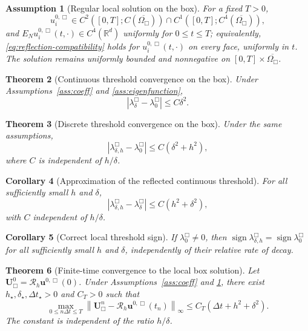 \documentclass[11pt]{article}
\newtheorem{theorem}{Theorem}[section]
\newtheorem{corollary}[theorem]{Corollary}
\newtheorem{assumption}[theorem]{Assumption}
\theoremstyle{definition}
\newcommand{\R}{\mathbb{R}}
\newcommand{\cR}{\mathcal{R}}
\newcommand{\norm}[1]{\left\lVert #1\right\rVert}
\newcommand{\U}{\bm U}
\newcommand{\uvec}{\bm u}
\begin{document}
\begin{assumption}[Regular local solution on the box]
\label{ass:solution-reg}
For a fixed $T>0$,
\[
 u_i^{0,\Box}
 \in C^2([0,T];C(\overline{\Omega_{\Box}}))
 \cap C^1([0,T];C^4(\overline{\Omega_{\Box}})),
\]
and $E_Nu_i^{0,\Box}(t,\cdot)\in C^4(\R^d)$ uniformly for $0\le t\le T$; equivalently, \eqref{eq:reflection-compatibility} holds for $u_i^{0,\Box}(t,\cdot)$ on every face, uniformly in $t$.  The solution remains uniformly bounded and nonnegative on $[0,T]\times\overline{\Omega_{\Box}}$.
\end{assumption}

\begin{theorem}[Continuous threshold convergence on the box]
\label{thm:continuous-spectral-ac}
Under Assumptions~\ref{ass:coeff} and \ref{ass:eigenfunction},
\begin{equation}
\label{eq:continuous-spectral-ac}
 |\lambda_\delta^{\Box}-\lambda_0^{\Box}|
 \le C\delta^2.
\end{equation}
\end{theorem}

\begin{theorem}[Discrete threshold convergence on the box]
\label{thm:discrete-spectral-ac}
Under the same assumptions,
\begin{equation}
\label{eq:spectral-ac}
 |\lambda_{\delta,h}^{\Box}-\lambda_0^{\Box}|
 \le C(\delta^2+h^2),
\end{equation}
where $C$ is independent of $h/\delta$.
\end{theorem}

\begin{corollary}[Approximation of the reflected continuous threshold]
\label{cor:nonlocal-threshold-approx}
For all sufficiently small $h$ and $\delta$,
\[
 |\lambda_{\delta,h}^{\Box}-\lambda_\delta^{\Box}|
 \le C(h^2+\delta^2),
\]
with $C$ independent of $h/\delta$.
\end{corollary}

\begin{corollary}[Correct local threshold sign]
\label{cor:eventual-sign}
If $\lambda_0^{\Box}\ne0$, then $\operatorname{sign}\lambda_{\delta,h}^{\Box}=\operatorname{sign}\lambda_0^{\Box}$ for all sufficiently small $h$ and $\delta$, independently of their relative rate of decay.
\end{corollary}

\begin{theorem}[Finite-time convergence to the local box solution]
\label{thm:nonlinear-ac}
Let $\U_{\Box}^0=\cR_h\uvec^{0,\Box}(0)$.  Under Assumptions~\ref{ass:coeff} and \ref{ass:solution-reg}, there exist $h_\star,\delta_\star,\Delta t_\star>0$ and $C_T>0$ such that
\begin{equation}
\label{eq:nonlinear-error}
 \max_{0\le n\Delta t\le T}
 \norm{\U_{\Box}^n-\cR_h\uvec^{0,\Box}(t_n)}_\infty
 \le
 C_T(\Delta t+h^2+\delta^2).
\end{equation}
The constant is independent of the ratio $h/\delta$.
\end{theorem}
\end{document}
